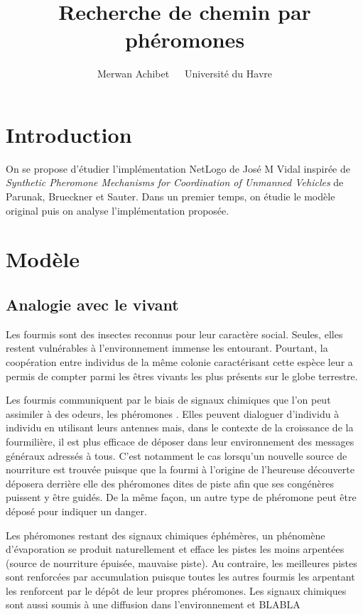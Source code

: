 \documentclass[12pt]{article}
\title{Recherche de chemin par phéromones}
\author{Merwan Achibet $\;$ \textendash $\;$  Université du Havre}
\date{}
\begin{document}
\maketitle

\section*{Introduction}

On se propose d'étudier l'implémentation NetLogo de José M Vidal
inspirée de \textit{Synthetic Pheromone Mechanisms for Coordination of
  Unmanned Vehicles} de Parunak, Brueckner et Sauter. Dans un premier
temps, on étudie le modèle original puis on analyse
l'implémentation proposée.

\section{Modèle}

\subsection{Analogie avec le vivant}

Les fourmis sont des insectes reconnus pour leur caractère
social. Seules, elles restent vulnérables à l'environnement immense
les entourant. Pourtant, la coopération entre individus de la même
colonie caractérisant cette espèce leur a permis de compter
parmi les êtres vivants les plus présents sur le globe terrestre.

Les fourmis communiquent par le biais de signaux chimiques que l'on peut assimiler à des odeurs, les phéromones
\cite{insectes}. Elles peuvent dialoguer d'individu à individu en
utilisant leurs antennes mais, dans le contexte de la croissance de la
fourmilière, il est plus efficace de déposer dans leur environnement
des messages généraux adressés à tous. C'est notamment le cas
lorsqu'un nouvelle source de nourriture est trouvée puisque que la
fourmi à l'origine de l'heureuse découverte déposera derrière elle des
phéromones dites de piste afin que ses congénères puissent y être
guidés. De la même façon, un autre type de phéromone peut être déposé pour 
indiquer un danger.

Les phéromones restant des signaux chimiques éphémères, un phénomène
d'évaporation se produit naturellement et efface les pistes les moins
arpentées (source de nourriture épuisée, mauvaise piste). Au
contraire, les meilleures pistes sont renforcées par accumulation puisque
toutes les autres fourmis les arpentant les renforcent par le dépôt de
leur propres phéromones. Les signaux chimiques sont aussi soumis à une diffusion
dans l'environnement et BLABLA
\end{document}
